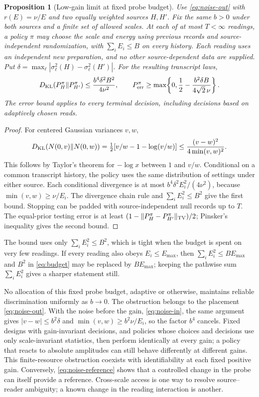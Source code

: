 \documentclass[12pt,a4paper]{article}
\newtheorem{proposition}[theorem]{Proposition}
\begin{document}
\begin{proposition}[Low-gain limit at fixed probe budget]\label{prop:budget}
Use \eqref{eq:noise-out} with $r(E)=\nu/E$ and two equally weighted
sources $H,H'$. Fix the same $b>0$ under both sources and a finite
set of allowed scales. At each of at most $T<\infty$ readings, a
policy $\pi$ may choose the scale and energy using previous records
and source-independent randomization, with
$\sum_i E_i\leq B$ on every history. Each reading uses an independent
new preparation, and no other source-dependent data are supplied.
Put $\delta=\max_\ell|\sigma_\ell^2(H)-\sigma_\ell^2(H')|$.
For the resulting transcript laws,
\begin{equation}
 D_{\rm KL}(P_H^\pi\Vert P_{H'}^\pi)
 \leq\frac{b^4\delta^2B^2}{4\nu^2},\qquad
 P_{\rm err}^{\pi}\geq
 \max\!\left\{0,\frac12-\frac{b^2\delta B}{4\sqrt2\,\nu}\right\}.
 \label{eq:budget}
\end{equation}
The error bound applies to every terminal decision, including
decisions based on adaptively chosen reads.
\end{proposition}
\begin{proof}
For centered Gaussian variances $v,w$,
\[
 D_{\rm KL}(N(0,v)\Vert N(0,w))
 =\tfrac12[v/w-1-\log(v/w)]
 \leq\frac{(v-w)^2}{4\min(v,w)^2}.
\]
This follows by Taylor's theorem for $-\log x$ between $1$ and $v/w$.
Conditional on a common transcript history, the policy uses the same
distribution of settings under either source. Each conditional
divergence is at most $b^4\delta^2E_i^2/(4\nu^2)$, because
$\min(v,w)\geq\nu/E_i$. The divergence chain rule and
$\sum_i E_i^2\leq B^2$ give the first bound. Stopping can be padded
with source-independent null records up to $T$. The equal-prior
testing error is at least $(1-\|P_H^\pi-P_{H'}^\pi\|_{\rm TV})/2$;
Pinsker's inequality gives the second bound.
\end{proof}

The bound uses only $\sum_iE_i^2\leq B^2$, which is tight when the
budget is spent on very few readings. If every reading also obeys
$E_i\leq E_{\max}$, then $\sum_iE_i^2\leq BE_{\max}$ and $B^2$ in
\eqref{eq:budget} may be replaced by $BE_{\max}$; keeping the pathwise
sum $\sum_iE_i^2$ gives a sharper statement still.

No allocation of this fixed probe budget, adaptive or otherwise,
maintains reliable discrimination uniformly as $b\to0$.
The obstruction belongs to the placement \eqref{eq:noise-out}. With
the noise before the gain, \eqref{eq:noise-in}, the same argument gives
$|v-w|\leq b^2\delta$ and $\min(v,w)\geq b^2\nu/E_i$, so the factor
$b^4$ cancels. Fixed designs with gain-invariant decisions, and
policies whose choices and decisions use only scale-invariant
statistics, then perform identically at every gain; a policy that
reacts to absolute amplitudes can still behave differently at
different gains.
This finite-resource obstruction coexists with identifiability at
each fixed positive gain. Conversely, \eqref{eq:noise-reference}
shows that a controlled change in the probe can itself provide a
reference. Cross-scale access is one way to resolve source--reader
ambiguity; a known change in the reading interaction is another.
\end{document}

